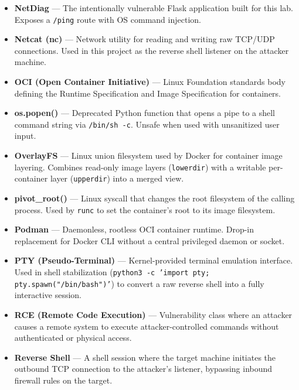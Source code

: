 \begin{itemize}
    \item \textbf{NetDiag} ---
    The intentionally vulnerable Flask application built for this
    lab. Exposes a \texttt{/ping} route with OS command injection.

    \item \textbf{Netcat (nc)} ---
    Network utility for reading and writing raw TCP/UDP
    connections. Used in this project as the reverse shell
    listener on the attacker machine.

    \item \textbf{OCI (Open Container Initiative)} ---
    Linux Foundation standards body defining the Runtime
    Specification and Image Specification for containers.

    \item \textbf{os.popen()} ---
    Deprecated Python function that opens a pipe to a shell
    command string via \texttt{/bin/sh -c}. Unsafe when
    used with unsanitized user input.

    \item \textbf{OverlayFS} ---
    Linux union filesystem used by Docker for container image
    layering. Combines read-only image layers
    (\texttt{lowerdir}) with a writable per-container layer
    (\texttt{upperdir}) into a merged view.

    \item \textbf{pivot\_root()} ---
    Linux syscall that changes the root filesystem of the
    calling process. Used by \texttt{runc} to set the
    container's root to its image filesystem.

    \item \textbf{Podman} ---
    Daemonless, rootless OCI container runtime. Drop-in
    replacement for Docker CLI without a central privileged
    daemon or socket.

    \item \textbf{PTY (Pseudo-Terminal)} ---
    Kernel-provided terminal emulation interface. Used in
    shell stabilization (\texttt{python3 -c 'import pty;
    pty.spawn("/bin/bash")'}) to convert a raw reverse
    shell into a fully interactive session.

    \item \textbf{RCE (Remote Code Execution)} ---
    Vulnerability class where an attacker causes a remote system
    to execute attacker-controlled commands without
    authenticated or physical access.

    \item \textbf{Reverse Shell} ---
    A shell session where the target machine initiates the
    outbound TCP connection to the attacker's listener, bypassing
    inbound firewall rules on the target.


\end{itemize}
